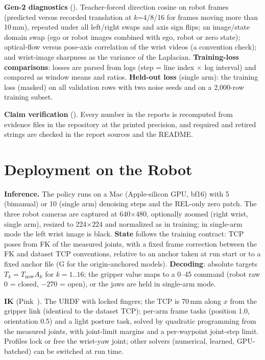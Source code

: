 \documentclass[conference,10pt]{IEEEtran}
\newcommand{\mm}{\,mm\xspace}
\begin{document}
\textbf{Gen-2 diagnostics} (). Teacher-forced direction cosine on robot frames (predicted versus recorded
translation at $k$=4/8/16 for frames moving more than 10\mm), repeated under all left/right swaps and axis sign flips; an image/state
domain swap (ego or robot images combined with ego, robot or zero state); optical-flow versus pose-axis correlation of the wrist
videos (a convention check); and wrist-image sharpness as the variance of the Laplacian. \textbf{Training-loss comparisons}: losses
are parsed from logs (step = line index $\times$ log interval) and compared as window means and ratios. \textbf{Held-out loss}
(single arm): the training loss (masked) on all validation rows with two noise seeds and on a 2{,}000-row training subset.

\textbf{Claim verification} (). Every number in the reports is recomputed from evidence files in the
repository at the printed precision, and required and retired strings are checked in the report sources and the README.

\section{Deployment on the Robot}\label{sec:deploy}
\textbf{Inference.} The policy runs on a Mac (Apple-silicon GPU, bf16) with 5 (bimanual) or 10 (single arm) denoising steps and the
REL-only zero patch. The three robot cameras are captured at 640$\times$480, optionally zoomed (right wrist, single arm), resized to
224$\times$224 and normalized as in training; in single-arm mode the left wrist image is black. \textbf{State} follows the training
contract: TCP poses from FK of the measured joints, with a fixed frame correction between the FK and dataset TCP conventions, relative
to an anchor taken at run start or to a fixed anchor file (G for the origin-anchored models). \textbf{Decoding}: absolute targets
$T_k=T_\text{now}A_k$ for $k=1..16$; the gripper value maps to a 0--45 command (robot raw 0 = closed, $-270$ = open), or the jaws are
held in single-arm mode.

\textbf{IK} (Pink~\cite{caron2024pink}). The URDF with locked fingers; the TCP is 70\mm{} along $x$ from the gripper link (identical to
the dataset TCP); per-arm frame tasks (position 1.0, orientation 0.5) and a light posture task, solved by quadratic programming from the
measured joints, with joint-limit margins and a per-waypoint joint-step limit. Profiles lock or free the wrist-yaw joint; other solvers
(numerical, learned, GPU-batched) can be switched at run time.
\end{document}
